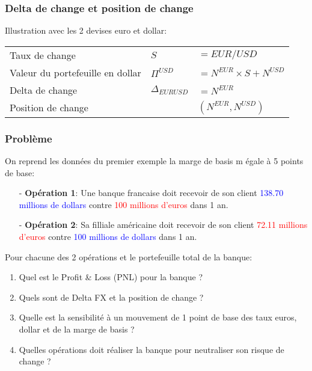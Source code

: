 \documentclass{beamer}
\begin{document}
\begin{frame}
\frametitle{Delta de change et position de change}
\small
Illustration avec les 2 devises euro et dollar:\\ 
\vspace{0.5cm}
\begin{tabular}{|l|l l|}
\hline
Taux de change&$S$&$= EUR/USD$\\
Valeur du portefeuille en dollar&$\Pi^{USD}$&$=N^{EUR} \times S + N^{USD}$\\
Delta de change&$\Delta_{EURUSD}$&$=N^{EUR}$\\
Position de change&&$(N^{EUR},N^{USD})$\\
\hline
\end{tabular}
\end{frame}

\begin{frame}
\frametitle{Problème}
On reprend les données du premier exemple la marge de basis m égale à 5 points de base:\\
\begin{itemize}
\item[-] \textbf{Opération 1}: Une banque francaise doit recevoir de son client \textcolor{blue}{138.70 millions de dollars} contre \textcolor{red}{100 millions d'euros} dans 1 an.
\item[-] \textbf{Opération 2}: Sa filliale américaine doit recevoir de son client \textcolor{red}{72.11 millions d'euros} contre \textcolor{blue}{100 millions de dollars} dans 1 an.
\end{itemize}
Pour chacune des 2 opérations et le portefeuille total de la banque:\\
\begin{enumerate}
\item Quel est le Profit \& Loss (PNL) pour la banque ?
\item Quels sont de Delta FX et la position de change ?
\item Quelle est la sensibilité à un mouvement de 1 point de base des taux euros, dollar et de la marge de basis ?
\item Quelles opérations doit réaliser la banque pour neutraliser son risque de change ?
\end{enumerate}
\end{frame}
\end{document}
